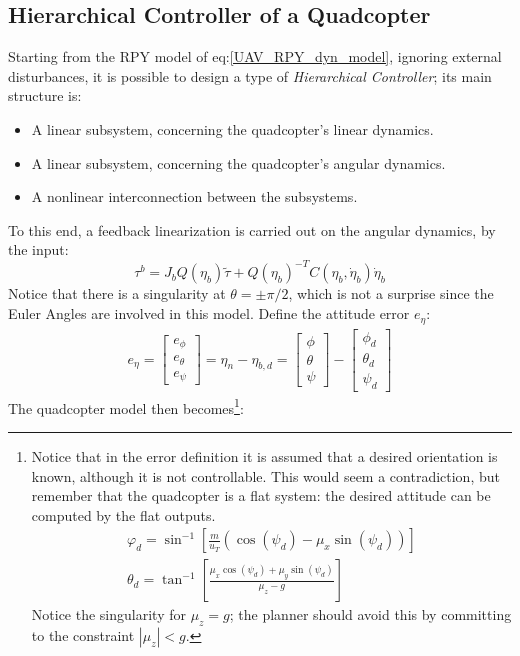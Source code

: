 \subsection{Hierarchical Controller of a Quadcopter}
Starting from the RPY model of eq:\ref{UAV_RPY_dyn_model}, ignoring external disturbances, it is possible to design a type of \textit{Hierarchical Controller}; its main structure is:
\begin{itemize}
    \item A linear subsystem, concerning the quadcopter's linear dynamics.
    \item A linear subsystem, concerning the quadcopter's angular dynamics.
    \item A nonlinear interconnection between the subsystems.
\end{itemize}
To this end, a feedback linearization is carried out on the angular dynamics, by the input:
\begin{equation*}
    \tau^b=J_{b}Q(\eta_b)\tilde{\tau}+Q(\eta_b)^{-T}C(\eta_b,\dot{\eta}_b)\dot{\eta}_b
\end{equation*}
Notice that there is a singularity at $\theta=\pm\pi/2$, which is not a surprise since the Euler Angles are involved in this model. Define the attitude error $e_\eta$:
\begin{gather}\label{UAV_hier_attitude_error}
    e_\eta=
    \begin{bmatrix}
        e_\phi \\ e_\theta \\ e_\psi
    \end{bmatrix}=
    \eta_n-\eta_{b,d}=
    \begin{bmatrix}
        \phi \\ \theta \\ \psi
    \end{bmatrix} -
    \begin{bmatrix}
        \phi_d \\ \theta_d \\ \psi_d
    \end{bmatrix} 
\end{gather}
The quadcopter model then becomes\footnote{Notice that in the error definition it is assumed that a desired orientation is known, although it is not controllable. This would seem a contradiction, but remember that the quadcopter is a flat system: the desired attitude can be computed by the flat outputs.
\begin{gather*}
    \varphi_d=\sin^{-1}\left[\frac{m}{u_T}\left(\cos(\psi_d)-\mu_x\sin(\psi_d)\right)\right] \\
    \theta_d=\tan^{-1}\left[\frac{\mu_x\cos(\psi_d)+\mu_y\sin(\psi_d)}{\mu_z-g}\right]
\end{gather*}
Notice the singularity for $\mu_z=g$; the planner should avoid this by committing to the constraint $|\mu_z|<g$.
}:
